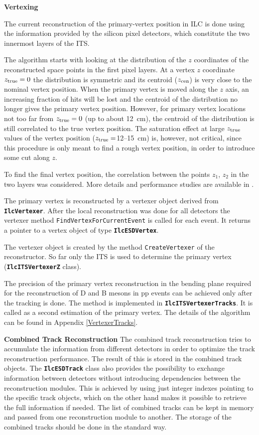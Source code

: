 \documentclass[12pt,a4paper,twoside]{article}
\newcommand{\class}[1]{\texttt{\textbf{#1}}\xspace}
\newcommand{\method}[1]{\texttt{#1}\xspace}
\begin{document}
\noindent
\textbf{Vertexing}

The current reconstruction of the primary-vertex 
position in ILC is done using the information provided by the 
silicon pixel detectors, which constitute the two innermost layers of the 
ITS.

The algorithm starts with looking at the
distribution of the $z$ coordinates of the reconstructed space points 
in the first pixel layers.
At a vertex $z$ coordinate $z_{\rm true} = 0$ the distribution is 
symmetric and 
its centroid ($z_{\rm cen}$) is very close to the nominal
vertex position. When the primary vertex is moved along the $z$ axis, an 
increasing fraction
of hits will be lost and the centroid of the distribution no longer gives
the primary
vertex position. However, for primary vertex locations not too far from 
$z_{\rm true} = 0$ 
(up to about 12~cm), the centroid of the distribution is still correlated to 
the true vertex position.
The saturation effect at large $z_{\rm true}$ values of the vertex position 
($z_{\rm true} = $12--15~cm) 
is, however, not critical, since this procedure is only meant to find a rough 
vertex position, in order to introduce some cut along $z$.

To find the final vertex position,
the correlation between the points $z_1$, $z_2$ in the two layers
was considered. More details and performance studies are available in
\cite{PPRVII}.

The primary vertex is reconstructed by a vertexer object derived from
\class{IlcVertexer}. After the local reconstruction was done for all detectors
the vertexer method \method{FindVertexForCurrentEvent} is called for each
event. It returns a pointer to a vertex object of type \class{IlcESDVertex}.

The vertexer object is created by the method \method{CreateVertexer} of the
reconstructor. So far only the ITS is used to determine the primary
vertex (\class{IlcITSVertexerZ} class).

The precision of the primary vertex reconstruction in the bending plane 
required for the reconstruction of D and B mesons in pp events
can be achieved only after the tracking is done. The method is
implemented in \class{IlcITSVertexerTracks}. It is called as a second
estimation of the primary vertex. The details of the algorithm can be
found in Appendix \ref{VertexerTracks}.

\noindent
\textbf{Combined Track Reconstruction}
The combined track reconstruction tries to accumulate the information from
different detectors in order to optimize the track reconstruction performance. 
The result of this is stored in the combined track objects.
The \class{IlcESDTrack} class also
provides the possibility to exchange information between detectors
without introducing dependencies between the reconstruction modules. 
This is achieved by using just integer indexes pointing to the
specific track objects, which on the other hand makes it possible to
retrieve the full information if needed. 
The list of combined tracks can be kept in memory and passed from one
reconstruction module to another. 
The storage of the combined tracks should be done in the standard way.
\end{document}
